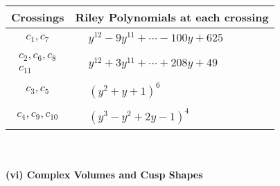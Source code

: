 \documentclass[1p]{elsarticle_modified}
\theoremstyle{definition}
\begin{document}
\begin{tabular}{m{50pt}|m{274pt}}
Crossings & \hspace{64pt}Riley Polynomials at each crossing \\
\hline $$\begin{aligned}c_{1},c_{7}\end{aligned}$$&$\begin{aligned}
&y^{12}-9 y^{11}+\cdots-100 y+625
\end{aligned}$\\
\hline $$\begin{aligned}c_{2},c_{6},c_{8}\\c_{11}\end{aligned}$$&$\begin{aligned}
&y^{12}+3 y^{11}+\cdots+208 y+49
\end{aligned}$\\
\hline $$\begin{aligned}c_{3},c_{5}\end{aligned}$$&$\begin{aligned}
&(y^2+y+1)^6
\end{aligned}$\\
\hline $$\begin{aligned}c_{4},c_{9},c_{10}\end{aligned}$$&$\begin{aligned}
&(y^3- y^2+2 y-1)^4
\end{aligned}$\\
\hline
\end{tabular}\\~\\
\newpage\flushleft \textbf{(vi) Complex Volumes and Cusp Shapes}
\end{document}
